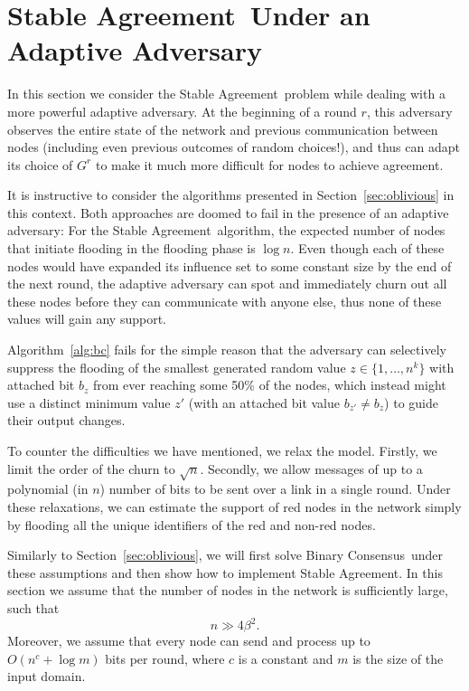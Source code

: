 \documentclass[leqno,11pt]{article}
\newcommand{\set}[1]{\{#1\}}
\newcommand{\sa}{{\sc Stable Agreement}}
\newcommand{\bc}{{\sc Binary Consensus}}
\newcommand{\onlyLong}[1]{\ifthenelse{\boolean{short}}{}{#1}}
\begin{document}
\section{\sa\ Under an Adaptive Adversary} \label{sec:adaptive}

In this section we consider the \sa\ problem while dealing with a more
powerful adaptive adversary. At the beginning of a round $r$, this adversary
observes the entire state of the network and previous communication between
nodes (including even previous outcomes of random choices!), and thus can adapt
its choice of $G^{r}$ to make it much more difficult for nodes to achieve
agreement. 


It is instructive to consider the algorithms  presented in
Section~\ref{sec:oblivious} in this context.  Both approaches are doomed to fail
in the presence of an adaptive adversary: For the \sa\ algorithm, the expected
number of nodes that initiate flooding in the flooding phase is $\log n$. Even
though each of these nodes would have expanded its influence set to
some constant size by the end of the next round, the adaptive adversary can spot
and immediately churn out all these nodes before they can communicate with
anyone else, thus none of these values will gain any support. 


Algorithm~\ref{alg:bc} fails for the simple reason that the adversary can
selectively suppress the flooding of the smallest generated random value
$z\in\set{1,\dots,n^k}$ with attached bit $b_z$ from ever reaching some 50\% of the
nodes, which instead might use a distinct minimum value $z'$ (with an attached
bit value $b_{z'}\ne b_z$) to guide their output
changes.  


To counter the difficulties we have mentioned, we relax the model. Firstly, we
limit the order of the churn to $\sqrt{n}$. Secondly, we  allow messages of up
to a polynomial (in $n$) number of bits to be sent over a link in a single round. 
Under these relaxations, we can estimate the support of red nodes in the network
simply by flooding all the unique identifiers of the red and non-red
nodes\onlyLong{ (cf.\ Theorem~\ref{thm:AdaptiveSupport})}.

Similarly to Section~\ref{sec:oblivious}, we will first solve \bc\ under these
assumptions and then show how to implement \sa. In this section we assume that
the number of nodes in the network is sufficiently large, such that
\begin{equation} \label{eq:numberOfNodesAdaptive}
  n \gg 4\beta^2\text{.}
\end{equation}
Moreover, we assume that every node can send and process up to $O(n^c + \log m)$
bits per round, where $c$ is a constant and $m$ is the size of the input domain.
\end{document}

